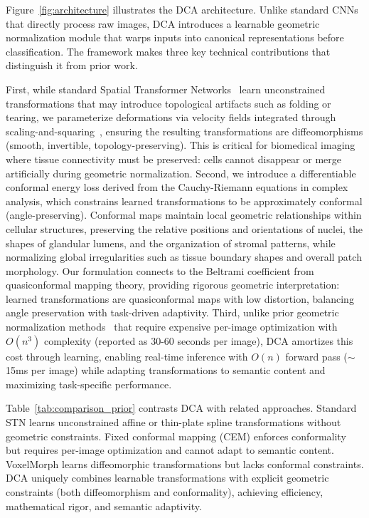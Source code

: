 \documentclass[10pt,journal,compsoc]{IEEEtran}
\begin{document}
Figure~\ref{fig:architecture} illustrates the DCA architecture. Unlike standard CNNs that directly process raw images, DCA introduces a learnable geometric normalization module that warps inputs into canonical representations before classification. The framework makes three key technical contributions that distinguish it from prior work.

First, while standard Spatial Transformer Networks~\cite{jaderberg2015spatial} learn unconstrained transformations that may introduce topological artifacts such as folding or tearing, we parameterize deformations via velocity fields integrated through scaling-and-squaring~\cite{arsigny2006logdiff}, ensuring the resulting transformations are diffeomorphisms (smooth, invertible, topology-preserving). This is critical for biomedical imaging where tissue connectivity must be preserved: cells cannot disappear or merge artificially during geometric normalization. Second, we introduce a differentiable conformal energy loss derived from the Cauchy-Riemann equations in complex analysis, which constrains learned transformations to be approximately conformal (angle-preserving). Conformal maps maintain local geometric relationships within cellular structures, preserving the relative positions and orientations of nuclei, the shapes of glandular lumens, and the organization of stromal patterns, while normalizing global irregularities such as tissue boundary shapes and overall patch morphology. Our formulation connects to the Beltrami coefficient from quasiconformal mapping theory, providing rigorous geometric interpretation: learned transformations are quasiconformal maps with low distortion, balancing angle preservation with task-driven adaptivity. Third, unlike prior geometric normalization methods~\cite{huang2024surface} that require expensive per-image optimization with $O(n^3)$ complexity (reported as 30-60 seconds per image), DCA amortizes this cost through learning, enabling real-time inference with $O(n)$ forward pass ($\sim$15ms per image) while adapting transformations to semantic content and maximizing task-specific performance.

Table~\ref{tab:comparison_prior} contrasts DCA with related approaches. Standard STN learns unconstrained affine or thin-plate spline transformations without geometric constraints. Fixed conformal mapping (CEM) enforces conformality but requires per-image optimization and cannot adapt to semantic content. VoxelMorph learns diffeomorphic transformations but lacks conformal constraints. DCA uniquely combines learnable transformations with explicit geometric constraints (both diffeomorphism and conformality), achieving efficiency, mathematical rigor, and semantic adaptivity.
\end{document}
